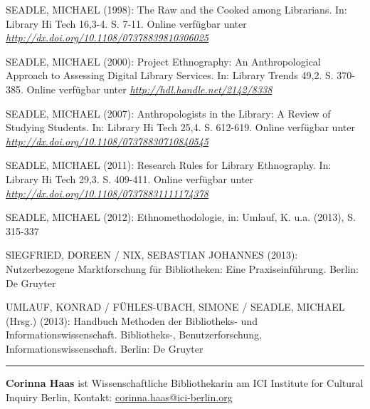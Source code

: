 \documentclass[a4paper,
fontsize=11pt,
oneside,
numbers=noperiodatend,
parskip=half-,
bibliography=totoc,
final
]{scrartcl}
\begin{document}
SEADLE, MICHAEL (1998): The Raw and the Cooked among Librarians. In:
Library Hi Tech 16,3-4. S. 7-11. Online verfügbar unter
\href{http://dx.doi.org/10.1108/07378839810306025}{\emph{http://dx.doi.org/10.1108/07378839810306025}}

SEADLE, MICHAEL (2000): Project Ethnography: An Anthropological Approach
to Assessing Digital Library Services. In: Library Trends 49,2. S.
370-385. Online verfügbar unter
\href{http://hdl.handle.net/2142/8338}{\emph{http://hdl.handle.net/2142/8338}}

SEADLE, MICHAEL (2007): Anthropologists in the Library: A Review of
Studying Students. In: Library Hi Tech 25,4. S. 612-619. Online
verfügbar unter
\href{http://dx.doi.org/10.1108/07378830710840545}{\emph{http://dx.doi.org/10.1108/07378830710840545}}

SEADLE, MICHAEL (2011): Research Rules for Library Ethnography. In:
Library Hi Tech 29,3. S. 409-411. Online verfügbar unter
\href{http://dx.doi.org/10.1108/07378831111174378}{\emph{http://dx.doi.org/10.1108/07378831111174378}}

SEADLE, MICHAEL (2012): Ethnomethodologie, in: Umlauf, K. u.a. (2013),
S. 315-337

SIEGFRIED, DOREEN / NIX, SEBASTIAN JOHANNES (2013): Nutzerbezogene
Marktforschung für Bibliotheken: Eine Praxiseinführung. Berlin: De
Gruyter

UMLAUF, KONRAD / FÜHLES-UBACH, SIMONE / SEADLE, MICHAEL (Hrsg.) (2013):
Handbuch Methoden der Bibliotheks- und Informationswissenschaft.
Bibliotheks-, Benutzerforschung, Informationswissenschaft. Berlin: De
Gruyter

\begin{center}\rule{0.5\linewidth}{\linethickness}\end{center}

\textbf{Corinna Haas} ist Wissenschaftliche Bibliothekarin am ICI
Institute for Cultural Inquiry Berlin, Kontakt:
\url{corinna.haas@ici-berlin.org}
\end{document}

